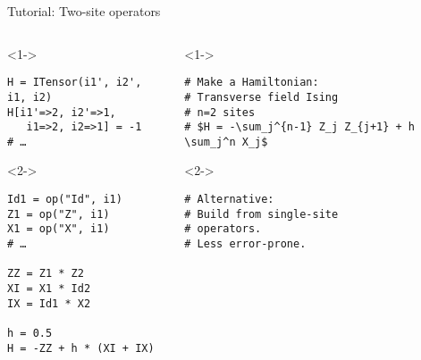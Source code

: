 \begin{frame}[fragile]{Tutorial: Two-site operators}


\begin{columns}

\begin{column}{4.5cm}

\begin{onlyenv}<1->

\begin{lstlisting}[language=JuliaLocal, style=julia, basicstyle=\small]
H = ITensor(i1', i2', i1, i2)
H[i1'=>2, i2'=>1,
   i1=>2, i2=>1] = -1
# …
\end{lstlisting}

\end{onlyenv}

\begin{onlyenv}<2->

\begin{lstlisting}[language=JuliaLocal, style=julia, basicstyle=\small]
Id1 = op("Id", i1)
Z1 = op("Z", i1)
X1 = op("X", i1)
# …

ZZ = Z1 * Z2
XI = X1 * Id2
IX = Id1 * X2

h = 0.5
H = -ZZ + h * (XI + IX)
\end{lstlisting}

\end{onlyenv}

\end{column}

\begin{column}{5.5cm}

\begin{onlyenv}<1->

\begin{lstlisting}[style=julia, numbers=none, mathescape, basicstyle=\small]
# Make a Hamiltonian:
# Transverse field Ising
# n=2 sites
# $H = -\sum_j^{n-1} Z_j Z_{j+1} + h \sum_j^n X_j$
\end{lstlisting}

\end{onlyenv}

\begin{onlyenv}<2->

\begin{lstlisting}[style=julia, numbers=none, mathescape, basicstyle=\small]
# Alternative:
# Build from single-site
# operators.
# Less error-prone.






 \end{lstlisting}

\end{onlyenv}

\end{column}

\end{columns}

\end{frame}
